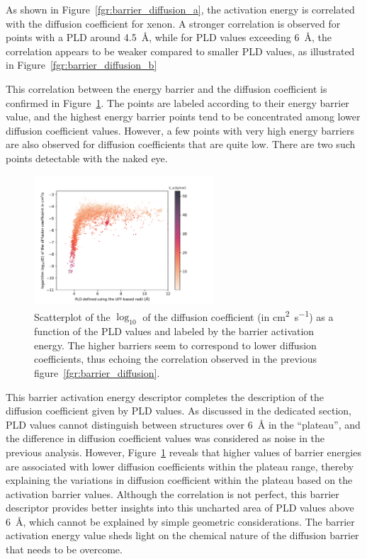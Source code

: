 \documentclass[main]{subfiles}
\begin{document}
As shown in Figure~\ref{fgr:barrier_diffusion_a}, the activation energy is correlated with the diffusion coefficient for xenon. A stronger correlation is observed for points with a PLD around \SI{4.5}{\angstrom}, while for PLD values exceeding \SI{6}{\angstrom}, the correlation appears to be weaker compared to smaller PLD values, as illustrated in Figure~\ref{fgr:barrier_diffusion_b}

This correlation between the energy barrier and the diffusion coefficient is confirmed in Figure~\ref{fgr:diff_pld_barrier}. The points are labeled according to their energy barrier value, and the highest energy barrier points tend to be concentrated among lower diffusion coefficient values. However, a few points with very high energy barriers are also observed for diffusion coefficients that are quite low. There are two such points detectable with the naked eye. 

\begin{figure}[ht]
  \centering
    \includegraphics[width=0.6\textwidth]{figures/5-diffusion/difflog_Df-uff298K_barrier.pdf}
    \caption{ Scatterplot of the $\log_{10}$ of the diffusion coefficient (in \si{\square\cm\per\s}) as a function of the PLD values and labeled by the barrier activation energy. The higher barriers seem to correspond to lower diffusion coefficients, thus echoing the correlation observed in the previous figure~\ref{fgr:barrier_diffusion}.}\label{fgr:diff_pld_barrier}
\end{figure}

This barrier activation energy descriptor completes the description of the diffusion coefficient given by PLD values. As discussed in the dedicated section, PLD values cannot distinguish between structures over \SI{6}{\angstrom} in the ``plateau'', and the difference in diffusion coefficient values was considered as noise in the previous analysis. However, Figure~\ref{fgr:diff_pld_barrier} reveals that higher values of barrier energies are associated with lower diffusion coefficients within the plateau range, thereby explaining the variations in diffusion coefficient within the plateau based on the activation barrier values.
Although the correlation is not perfect, this barrier descriptor provides better insights into this uncharted area of PLD values above \SI{6}{\angstrom}, which cannot be explained by simple geometric considerations. The barrier activation energy value sheds light on the chemical nature of the diffusion barrier that needs to be overcome.
\end{document}
